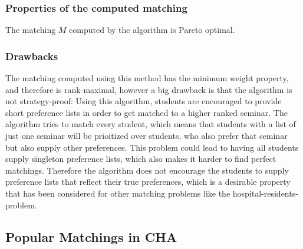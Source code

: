 \subsubsection{Properties of the computed matching}
The matching $M$ computed by the algorithm is Pareto optimal. \cite{SngThesis}

\subsubsection{Drawbacks}
The matching computed using this method has the minimum weight property, and therefore is rank-maximal, however a big drawback is that the algorithm is not strategy-proof: Using this algorithm, students are encouraged to provide short preference lists in order to get matched to a higher ranked seminar. The algorithm tries to match every student, which means that students with a list of just one seminar will be prioitized over students, who also prefer that seminar but also supply other preferences. This problem could lead to having all students supply singleton preference lists, which also makes it harder to find perfect matchings. Therefore the algorithm does not encourage the students to supply preference lists that reflect their true preferences, which is a desirable property that has been considered for other matching problems like the hospital-residents-problem.\cite{Gusfield}

\subsection{Popular Matchings in CHA}